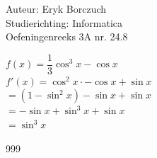 \documentclass[a4paper]{article}
\begin{document}
  
\noindent \large Auteur: Eryk Borczuch \\
\noindent \large Studierichting: Informatica\\
\noindent \large Oefeningenreeks 3A nr. 24.8\\

\medskip

\normalsize

$f(x) = \dfrac{1}{3} \cos^3 x -\cos x$\\

$ f'(x) = \cos ^2 x \cdot - \cos x + \sin x$\\

$= (1- \sin ^2 x)- \sin x + \sin x$\\

$= - \sin x + \sin ^3 x+\sin x$\\

$= \sin ^3 x$\\

\begin{thebibliography}{999}
\end{thebibliography}
\end{document}
